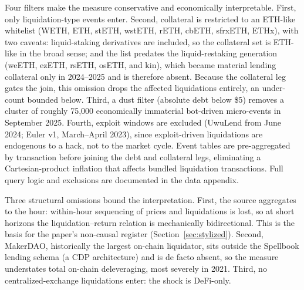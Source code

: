 Four filters make the measure conservative and economically interpretable.
First, only liquidation-type events enter. Second, collateral is restricted to an
ETH-like whitelist (WETH, ETH, stETH, wstETH, rETH, cbETH, sfrxETH, ETHx),
with two caveats: liquid-staking derivatives are included, so the
collateral set is ETH-like in the broad sense; and the list predates the
liquid-restaking generation (weETH, ezETH, rsETH, osETH, and kin), which
became material lending collateral only in 2024--2025 and is therefore
absent. Because the collateral leg gates the join, this omission drops the
affected liquidations entirely, an under-count bounded below. Third, a dust filter (absolute
debt below \$5) removes a cluster of roughly 75{,}000 economically
immaterial bot-driven micro-events in September 2025. Fourth, exploit windows
are excluded (UwuLend from June 2024; Euler v1, March--April 2023), since
exploit-driven liquidations are endogenous to a hack, not to the market
cycle. Event tables are pre-aggregated by transaction before joining the
debt and collateral legs, eliminating a Cartesian-product inflation that
affects bundled liquidation transactions. Full query logic and exclusions
are documented in the data appendix.

Three structural omissions bound the interpretation. First, the source
aggregates to the hour: within-hour sequencing of prices and liquidations
is lost, so at short horizons the liquidation--return relation is
mechanically bidirectional. This is the basis for the paper's non-causal register
(Section~\ref{sec:stylized}). Second, MakerDAO, historically the largest
on-chain liquidator, sits outside the Spellbook lending schema (a CDP
architecture) and is de facto absent, so the measure understates total
on-chain deleveraging, most severely in 2021. Third, no
centralized-exchange liquidations enter: the shock is DeFi-only.

